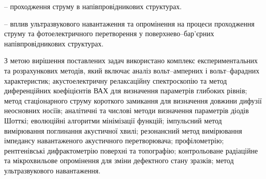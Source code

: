 {\ObjectTXT} --
проходження струму в напівпровідникових структурах.

{\PredmetTXT} --
вплив ультразвукового навантаження та опромінення на
процеси проходження струму та фотоелектричного перетворення у поверхнево--бар'єрних напівпровідникових структурах.


{\MethodTXT}
З метою вирішення поставлених задач використано комплекс експериментальних та розрахункових методів, який включає
аналіз вольт--амперних і
вольт--фарадних характеристик;
акустоелектричну релаксаційну спектроскопію та метод диференційних коефіцієнтів ВАХ для визначення параметрів глибоких рівнів;
метод стаціонарного струму короткого замикання для визначення довжини дифузії неосновних носіїв;
аналітичні та числові методи визначення параметрів діодів Шотткі;
еволюційні алгоритми мінімізації функцій;
імпульсний метод вимірювання поглинання акустичної хвилі;
резонансний метод вимірювання імпедансу навантаженого акустичного перетворювача;
профілометрію;
рентгенівські дифрактометрію поверхні та топографію;
контрольоване радіаційне та мікрохвильове опромінення для зміни дефектного стану зразків;
метод ультразвукового навантаження.



